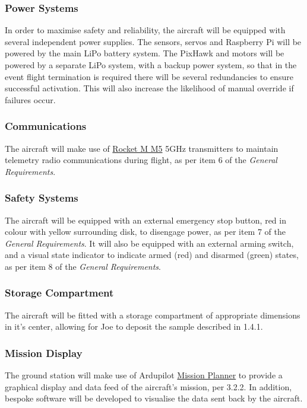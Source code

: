 \subsubsection*{Power Systems}
In order to maximise safety and reliability, the aircraft will be equipped with several independent power supplies. The sensors, servos and Raspberry Pi will be powered by the main LiPo battery system. The PixHawk and motors will be powered by a separate LiPo system, with a backup power system, so that in the event flight termination is required there will be several redundancies to ensure successful activation. This will also increase the likelihood of manual override if failures occur.

\subsubsection*{Communications}
The aircraft will make use of \href{https://www.ubnt.com/airmax/rocketm/}{Rocket M M5}  5GHz transmitters to maintain telemetry radio communications during flight, as per item 6 of the \textit{General Requirements}.

\subsubsection*{Safety Systems}
The aircraft will be equipped with an external emergency stop button, red in colour with yellow surrounding disk, to disengage power, as per item 7 of the \textit{General Requirements}. It will also be equipped with an external arming switch, and a visual state indicator to indicate armed (red) and disarmed (green) states, as per item 8 of the \textit{General Requirements}.

\subsubsection*{Storage Compartment}
The aircraft will be fitted with a storage compartment of appropriate dimensions in it's center, allowing for Joe to deposit the sample described in 1.4.1.

\subsubsection*{Mission Display}
The ground station will make use of Ardupilot \href{http://planner.ardupilot.com/}{Mission Planner} to provide a graphical display and data feed of the aircraft's mission, per 3.2.2. In addition, bespoke software will be developed to visualise the data sent back by the aircraft.

